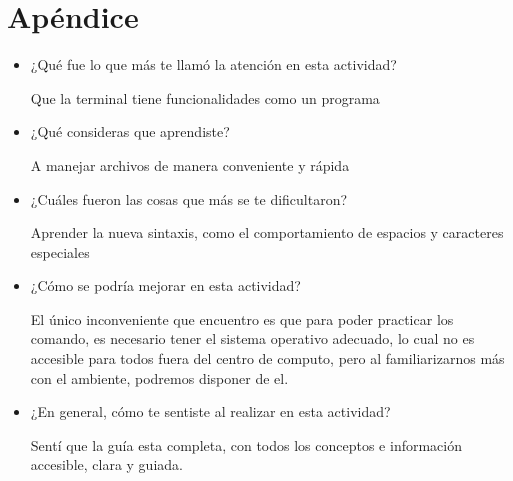 \documentclass[a4paper]{article}
\begin{document}
\section*{Apéndice}

\begin{itemize}
\item     ¿Qué fue lo que más te llamó la atención en esta actividad?

Que la terminal tiene funcionalidades como un programa

\item     ¿Qué consideras que aprendiste?

A manejar archivos de manera conveniente y rápida

\item     ¿Cuáles fueron las cosas que más se te dificultaron?

Aprender la nueva sintaxis, como el comportamiento de espacios y caracteres especiales

\item     ¿Cómo se podría mejorar en esta actividad?

El único inconveniente que encuentro es que para poder practicar los comando, es necesario tener el sistema operativo adecuado, lo cual no es accesible para todos fuera del centro de computo, pero al familiarizarnos más con el ambiente, podremos disponer de el.

\item     ¿En general, cómo te sentiste al realizar en esta actividad?

Sentí que la guía esta completa, con todos los conceptos e información accesible, clara y guiada.

\end{itemize}
\end{document}

